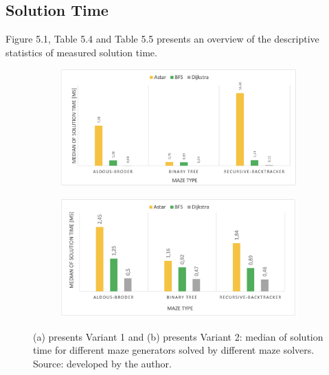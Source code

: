 \subsection{Solution Time}
Figure 5.1, Table 5.4 and Table 5.5 presents an overview of the descriptive statistics of measured solution time.\\
\begin{figure}[!h]
    \centering
    \begin{subfigure}[b]{0.7\textwidth}
        \centering
        \includegraphics[width=\textwidth]{averagetime.png}
        \caption{}
    \end{subfigure}
    \begin{subfigure}[b]{0.7\textwidth}  
        \centering 
        \includegraphics[width=\textwidth]{averagetime_variant2.png}
        \caption{}
    \end{subfigure}
    \caption[]{(a) presents Variant 1 and (b) presents Variant 2: median of solution time for different maze generators solved by different maze solvers.\\Source: developed by the author.}
\end{figure}
